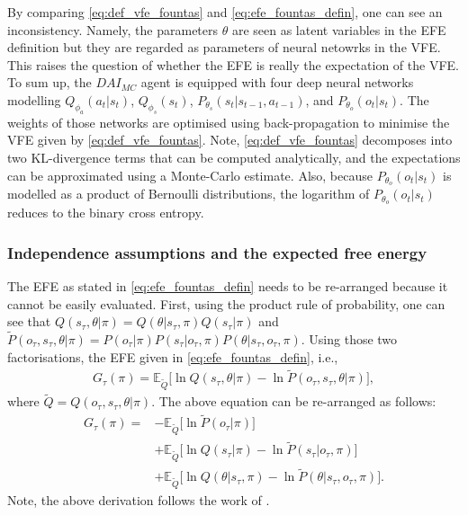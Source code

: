 \documentclass[twoside,11pt]{article}
\begin{document}
By comparing \eqref{eq:def_vfe_fountas} and \eqref{eq:efe_fountas_defin}, one can see an inconsistency. Namely, the parameters $\theta$ are seen as latent variables in the EFE definition but they are regarded as parameters of neural netowrks in the VFE. This raises the question of whether the EFE is really the expectation of the VFE. To sum up, the $DAI_{MC}$ agent is equipped with four deep neural networks modelling $Q_{\phi_a}(a_t|s_t)$, $Q_{\phi_s}(s_t)$, $P_{\theta_s}(s_t|s_{t-1},a_{t-1})$, and $P_{\theta_o}(o_t|s_t)$. The weights of those networks are optimised using back-propagation to minimise the VFE given by \eqref{eq:def_vfe_fountas}. Note, \eqref{eq:def_vfe_fountas} decomposes into two KL-divergence terms that can be computed analytically, and the expectations can be approximated using a Monte-Carlo estimate. Also, because $P_{\theta_o}(o_t|s_t)$ is modelled as a product of Bernoulli distributions, the logarithm of $P_{\theta_o}(o_t|s_t)$ reduces to the binary cross entropy.

\subsubsection{Independence assumptions and the expected free energy}

The EFE as stated in \eqref{eq:efe_fountas_defin} needs to be re-arranged because it cannot be easily evaluated. First, using the product rule of probability, one can see that $Q(s_\tau, \theta|\pi) = Q(\theta|s_\tau,\pi)Q(s_\tau|\pi)$ and $\tilde{P}(o_\tau,s_\tau,\theta|\pi) = P(o_\tau|\pi)P(s_\tau|o_\tau,\pi)P(\theta|s_\tau,o_\tau,\pi)$. Using those two factorisations, the EFE given in \eqref{eq:efe_fountas_defin}, i.e.,
\begin{align*}
G_{\tau}(\pi) = \mathbb{E}_{\tilde{Q}}\Big[ \ln Q(s_\tau, \theta|\pi) - \ln \tilde{P}(o_\tau, s_\tau,\theta|\pi) \Big],
\end{align*}
where $\tilde{Q} = Q(o_\tau, s_\tau, \theta|\pi)$. The above equation can be re-arranged as follows:
\begin{align}
G_{\tau}(\pi) = &- \mathbb{E}_{\tilde{Q}}\Big[ \ln \tilde{P}(o_\tau|\pi)\Big]\nonumber\\
&+ \mathbb{E}_{\tilde{Q}}\Big[ \ln Q(s_\tau|\pi) - \ln \tilde{P}(s_\tau|o_\tau, \pi) \Big]\nonumber\\
&+ \mathbb{E}_{\tilde{Q}}\Big[ \ln Q(\theta|s_\tau, \pi) - \ln \tilde{P}(\theta|s_\tau,o_\tau,\pi) \Big].\label{eq:efe_rearrangedd}
\end{align}
Note, the above derivation follows the work of \citet{DeepAIwithMCMC}.
\end{document}

